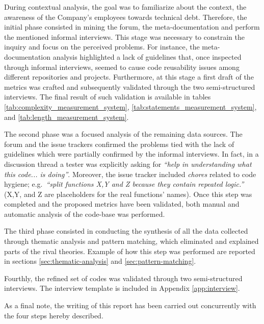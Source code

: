 During contextual analysis, the goal was to familiarize about the context, the awareness of the Company's employees towards technical debt.
Therefore, the initial phase consisted in mining the forum, the meta-documentation and perform the mentioned informal interviews. This stage was necessary to constrain the inquiry and focus on the perceived problems. For instance, the meta-documentation analysis highlighted a lack of guidelines that, once inspected through informal interviews, seemed to cause code reusability issues among different repositories and projects. Furthermore, at this stage a first draft of the metrics was crafted and subsequently validated through the two semi-structured interviews. The final result of such validation is available in tables \ref{tab:complexity_measurement_system}, \ref{tab:statements_measurement_system}, and \ref{tab:length_measurement_system}.

The second phase was a focused analysis of the remaining data sources. The forum and the issue trackers confirmed the problems tied with the lack of guidelines which were partially confirmed by the informal interviews. In fact, in a discussion thread a tester was explicitly asking for \textit{``help in understanding what this code... is doing''}. Moreover, the issue tracker included \textit{chores} related to code hygiene; e.g.\ \textit{``split functions X,Y and Z because they contain repeated logic.''} (X,Y, and Z are placeholders for the real functions' names). Once this step was completed and the proposed metrics have been validated, both manual and automatic analysis of the code-base was performed.

The third phase consisted in conducting the synthesis of all the data collected through thematic analysis and pattern matching, which eliminated and explained parts of the rival theories. Example of how this step was performed are reported in sections \ref{sec:thematic-analysis} and \ref{sec:pattern-matching}.

Fourthly, the refined set of codes was validated through two semi-structured interviews. The interview template is included in Appendix \ref{app:interview}.

As a final note, the writing of this report has been carried out concurrently with the four steps hereby described.
